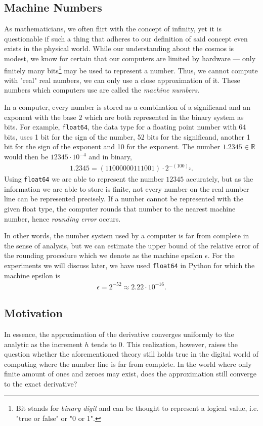 \subsection{Machine Numbers}

As mathematicians, we often flirt with the concept of infinity, yet it is questionable if such a thing that adheres to our definition of said concept even exists in the physical world. While our understanding about the cosmos is modest, we know for certain that our computers are limited by hardware --- only finitely many bits\footnote{Bit stands for \textit{binary digit} and can be thought to represent a logical value, i.e. "true or false" or "0 or 1".} may be used to represent a number. Thus, we cannot compute with "real" real numbers, we can only use a close approximation of it. These numbers which computers use are called the \textit{machine numbers}.

In a computer, every number is stored as a combination of a significand and an exponent with the base \(2\) which are both represented in the binary system as bits. For example, \texttt{float64}, the data type for a floating point number with 64 bits, uses 1 bit for the sign of the number, 52 bits for the significand, another 1 bit for the sign of the exponent and 10 for the exponent. The number \(1.2345 \in \mathbb{R}\) would then be \(12345 \cdot 10^{-4}\) and in binary,
\begin{align*}
    1.2345 = (11000000111001) \cdot 2^{-(100)_2}\text{.}
\end{align*}
Using \texttt{float64} we are able to represent the number \(12345\) accurately, but as the information we are able to store is finite, not every number on the real number line can be represented precisely. If a number cannot be represented with the given float type, the computer rounds that number to the nearest machine number, hence \textit{rounding error} occurs.

In other words, the number system used by a computer is far from complete in the sense of analysis, but we can estimate the upper bound of the relative error of the rounding procedure which we denote as the machine epsilon \(\epsilon\). For the experiments we will discuss later, we have used \texttt{float64} in Python for which the machine epsilon is
\begin{align*}
    \epsilon = 2^{-52} \approx 2.22 \cdot 10^{-16} \text{.}
\end{align*}

\subsection{Motivation}
In essence, the approximation of the derivative converges uniformly to the analytic as the increment \(h\) tends to \(0\). This realization, however, raises the question whether the aforementioned theory still holds true in the digital world of computing where the number line is far from complete. In the world where only finite amount of ones and zeroes may exist, does the approximation still converge to the exact derivative?\\
